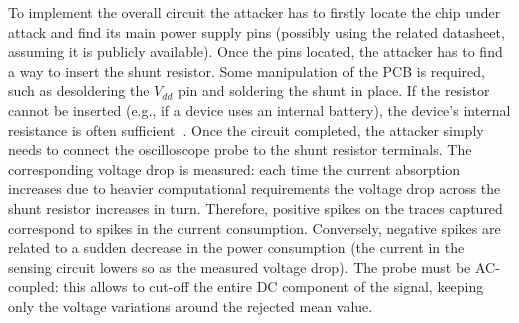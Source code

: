             To implement the overall circuit the attacker has to firstly locate the chip under attack and find its main power supply pins (possibly using the related datasheet, assuming it is publicly available). Once the pins located, the attacker has to find a way to insert the shunt resistor. Some manipulation of the PCB is required, such as desoldering the $V_{dd}$ pin and soldering the shunt in place. If the resistor cannot be inserted (e.g., if a
            device uses an internal battery), the device’s internal resistance is often sufficient~\cite{kocher2011introduction}. Once the circuit completed, the attacker simply needs to connect the oscilloscope probe to the shunt resistor terminals. The corresponding voltage drop is measured: each time the current absorption increases due to heavier computational requirements the voltage drop across the shunt resistor increases in turn. Therefore, positive spikes on the traces captured correspond to spikes in the current consumption. Conversely, negative spikes are related to a sudden decrease in the power consumption (the current in the sensing circuit lowers so as the measured voltage drop). The probe must be AC-coupled: this allows to cut-off the entire DC component of the signal, keeping only the voltage variations around the rejected mean value.

            
            
